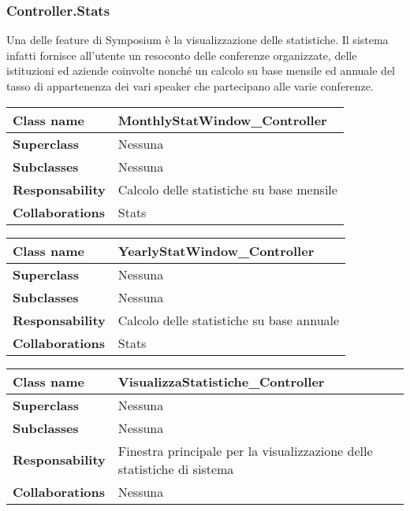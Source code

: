 \subsubsection{Controller.Stats}
Una delle feature di Symposium è la visualizzazione delle statistiche. Il sistema infatti fornisce all'utente un resoconto delle conferenze organizzate, delle istituzioni ed aziende coinvolte nonché un calcolo su base mensile ed annuale del tasso di appartenenza dei vari speaker che partecipano alle varie conferenze.
\begin{table}[h!]
	\begin{tabular}{|l|l|}
		\hline 
		\textbf{Class name} & MonthlyStatWindow\_Controller
		\\ \hline
		\textbf{Superclass} & Nessuna
		\\ \hline
		\multirow{1}{*}{\textbf{Subclasses}} & Nessuna
		\\ \hline
		\textbf{Responsability} & Calcolo delle statistiche su base mensile
		\\ \hline
		\multirow{1}{*}{\textbf{Collaborations}} & Stats \\ \hline
	\end{tabular}
\end{table}
\begin{table}[h!]
	\begin{tabular}{|l|l|}
		\hline 
		\textbf{Class name} & YearlyStatWindow\_Controller
		\\ \hline
		\textbf{Superclass} & Nessuna
		\\ \hline
		\multirow{1}{*}{\textbf{Subclasses}} & Nessuna
		\\ \hline
		\textbf{Responsability} & Calcolo delle statistiche su base annuale
		\\ \hline
		\multirow{1}{*}{\textbf{Collaborations}} & Stats \\ \hline
	\end{tabular}
\end{table}
\begin{table}[h!]
	\begin{tabular}{|l|l|}
		\hline 
		\textbf{Class name} & VisualizzaStatistiche\_Controller
		\\ \hline
		\textbf{Superclass} & Nessuna
		\\ \hline
		\multirow{1}{*}{\textbf{Subclasses}} & Nessuna
		\\ \hline
		\textbf{Responsability} & Finestra principale per la visualizzazione delle statistiche di sistema
		\\ \hline
		\multirow{1}{*}{\textbf{Collaborations}} & Nessuna \\ \hline
	\end{tabular}
\end{table}
